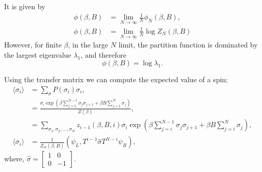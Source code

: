 \documentclass[letterpaper,english,12pt]{article}
\begin{document}
\begin{defn} It is given by 
\begin{align}
\phi(\beta,B) &= \lim \limits_{N\rightarrow\infty}\frac{1}{N}\phi_{N}(\beta,B),\nonumber\\
\phi(\beta,B) &=\lim \limits_{N\rightarrow\infty}\frac{1}{N}\log Z_{N}(\beta,B)\nonumber
\end{align}
However, for finite $\beta$, in the large $N$ limit, the partition function is dominated by the largest eigenvalue $\lambda_{1}$, and therefore 
\begin{equation}
\phi(\beta,B) = \log \lambda_{1}.
\label{lvn}
\end{equation}
\end{defn}

\begin{defn} Using the transfer matrix we can compute the expected value of a spin;
\begin{align}
\langle \sigma_{i}\rangle &= \sum_{\sigma} P(\sigma_{i})\sigma_{i},\nonumber\\
&= \frac{\sigma_{i}\exp\left(\beta\sum_{j=1}^{N-1}\sigma_{j}\sigma_{j+1}+\beta B \sum_{j=1}^{N}\sigma_{j}\right)}{Z(\beta)},\nonumber\\
&= \sum_{\sigma_{1},\sigma_{2},\ldots,\sigma_{N}}z_{i-1}(\beta,B,i)\sigma_{i}\exp\left(\beta \sum_{j=i}^{N-1}\sigma_{j}\sigma_{j+1}+\beta B \sum_{j=i}^{N}\sigma_{j}\right),\nonumber\\
\langle \sigma_{i}\rangle &= \frac{1}{Z_{N}(\beta,B)}(\psi_{L},T^{i-1}\hat{\sigma}T^{N-i}\psi_{R}),
\label{twlv}
\end{align}
where, $\hat{\sigma} = \begin{bmatrix} 1 & 0 \\ 0 & -1\end{bmatrix}$.
\end{defn}
\end{document}
